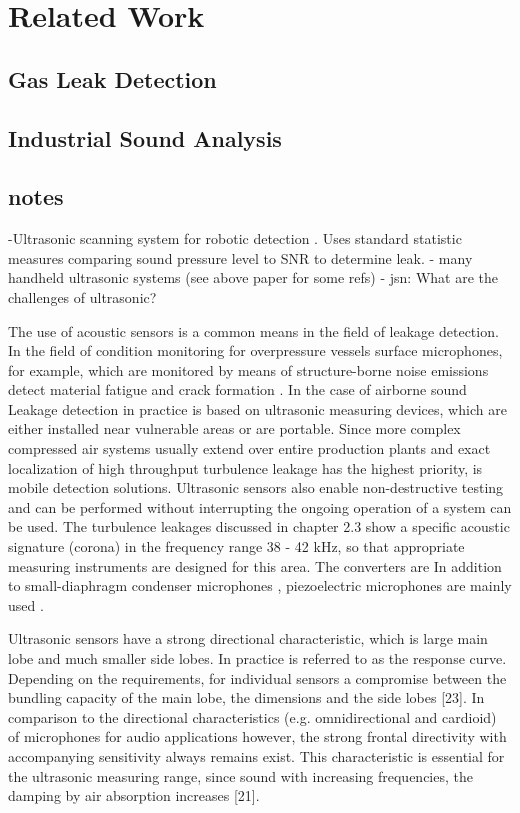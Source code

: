 \section{Related Work}

\subsection{Gas Leak Detection}

\subsection{Industrial Sound Analysis}

\subsection{notes}
-Ultrasonic scanning system for robotic detection \cite{Guenther2016:ultrasonic}. Uses standard statistic measures comparing sound pressure level to SNR to determine leak.
- many handheld ultrasonic systems (see above paper for some refs)
- jsn: What are the challenges of ultrasonic?

The use of acoustic sensors is a common means in the field of leakage detection.
In the field of condition monitoring for overpressure vessels surface microphones, for example, which are monitored by means of structure-borne noise emissions detect material fatigue and crack formation \simpletodo{[REF 20]}. 
In the case of airborne sound Leakage detection in practice is based on ultrasonic measuring devices, which are either installed near vulnerable areas or are portable. 
Since more complex compressed air systems usually extend over entire production plants and exact localization of high throughput turbulence leakage has the highest priority, is mobile detection solutions.
Ultrasonic sensors also enable non-destructive testing and can be performed without interrupting the ongoing operation of a system can be used. 
The turbulence leakages discussed in chapter 2.3 show a specific acoustic signature (corona) in the frequency range 38 - 42 kHz, so that appropriate measuring instruments are designed for this area.
 The converters are In addition to small-diaphragm condenser microphones \simpletodo{[REF 21]}, piezoelectric microphones are mainly used \simpletodo{[REF 22}.

Ultrasonic sensors have a strong directional characteristic, which is large main lobe and much smaller side lobes. 
In practice is referred to as the response curve. Depending on the requirements, for
individual sensors a compromise between the bundling capacity of the main lobe, the
dimensions and the side lobes [23]. 
In comparison to the directional characteristics (e.g. omnidirectional and cardioid) of microphones for audio applications however, the strong frontal directivity with accompanying sensitivity always remains
exist. 
This characteristic is essential for the ultrasonic measuring range, since sound with increasing frequencies, the damping by air absorption increases [21].

